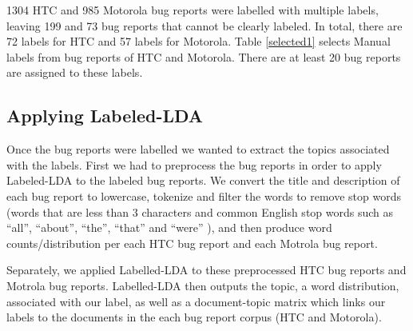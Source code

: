 \documentclass[10pt, conference, compsocconf]{IEEEtran}
\begin{document}
1304 HTC and 985 Motorola bug reports were labelled with multiple
labels, leaving 199 and 73 bug reports that cannot be clearly labeled.
In total, there are 72 labels for HTC and 57 labels for Motorola.
Table \ref{selected1} selects Manual labels from bug reports of HTC
and Motorola.  
There are at least 20 bug reports are assigned to these
labels.

\subsection{Applying Labeled-LDA}





Once the bug reports were labelled we wanted to extract the topics
associated with the labels. First we had to preprocess the bug reports 
in order to apply Labeled-LDA to the labeled bug reports. 
We convert the title and description of each bug report to lowercase,
tokenize and filter the words to remove stop words (words that are less than 3 characters and
common English stop words such as ``all'', ``about'', ``the'',
``that'' and ``were'' ), and then produce word counts/distribution per
each HTC bug report and each Motrola bug report.

Separately, we applied Labelled-LDA to these preprocessed HTC bug reports and Motrola bug reports.
Labelled-LDA then outputs the topic, a word distribution, associated
with our label, as well as a document-topic matrix which links our
labels to the documents in the each bug report corpus (HTC and
Motorola).
\end{document}
